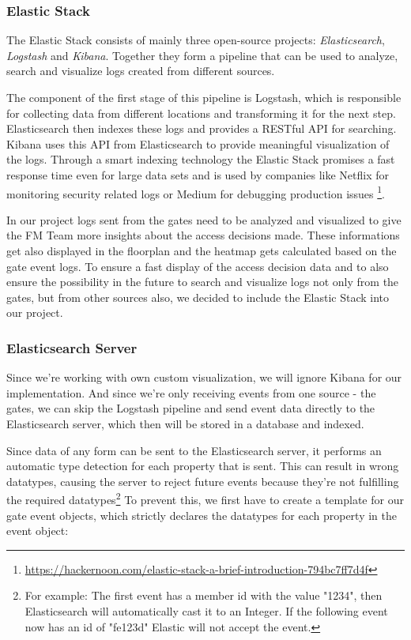 \subsubsection{Elastic Stack}
\label{Elastic Stack}

The Elastic Stack consists of mainly three open-source projects: \emph{Elasticsearch}, \emph{Logstash} and \emph{Kibana}.
Together they form a pipeline that can be used to analyze, search and visualize logs created from different sources. 

The component of the first stage of this pipeline is Logstash, which is responsible for collecting data from different locations and transforming it for the next step. Elasticsearch then indexes these logs and provides a RESTful API for searching. Kibana uses this API from Elasticsearch to provide meaningful visualization of the logs.
Through a smart indexing technology the Elastic Stack promises a fast response time even for large data sets and is used by companies like Netflix for monitoring security related logs or Medium for debugging production issues \footnote{\url{https://hackernoon.com/elastic-stack-a-brief-introduction-794bc7ff7d4f}}.

In our project logs sent from the gates need to be analyzed and visualized to give the FM Team more insights about the access decisions made. These informations get also displayed in the floorplan and the heatmap gets calculated based on the gate event logs. To ensure a fast display of the access decision data and to also ensure the possibility in the future to search and visualize logs not only from the gates, but from other sources also, we decided to include the Elastic Stack into our project.

\subsubsection{Elasticsearch Server}

Since we're working with own custom visualization, we will ignore Kibana for our implementation. And since we're only receiving events  from one source - the gates, we can skip the Logstash pipeline and send event data directly to the Elasticsearch server, which then will be stored in a database and indexed.

Since data of any form can be sent to the Elasticsearch server, it performs an automatic type detection for each property that is sent. This can result in wrong datatypes, causing the server to reject future events because they're not fulfilling the required datatypes\footnote{For example: The first event has a member id with the value "1234", then Elasticsearch will automatically cast it to an Integer. If the following event now has an id of "fe123d" Elastic will not accept the event.} To prevent this, we first have to create a template for our gate event objects, which strictly declares the datatypes for each property in the event object:

